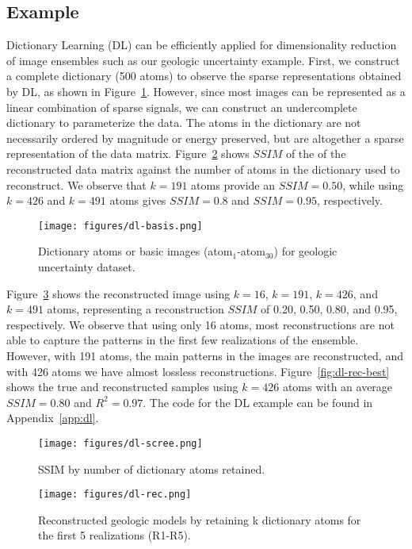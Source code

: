 \documentclass[a4paper,fleqn,12pt]{article}
\begin{document}
\subsection*{Example}
Dictionary Learning (DL) can be efficiently applied for dimensionality reduction of image ensembles such as our geologic uncertainty example. First, we construct a complete dictionary (500 atoms) to observe the sparse representations obtained by DL, as shown in Figure~\ref{fig:dl-basis}. However, since most images can be represented as a linear combination of sparse signals, we can construct an undercomplete dictionary to parameterize the data. The atoms in the dictionary are not necessarily ordered by magnitude or energy preserved, but are altogether a sparse representation of the data matrix. Figure~\ref{fig:dl-scree} shows $SSIM$ of the of the reconstructed data matrix against the number of atoms in the dictionary used to reconstruct. We observe that $k=191$ atoms provide an $SSIM=0.50$, while using $k=426$ and $k=491$ atoms gives $SSIM=0.8$ and $SSIM=0.95$, respectively.

\begin{figure}[H]
    \centering
    \texttt{[image: figures/dl-basis.png]}
    \caption{Dictionary atoms or basic images (atom$_1$-atom$_{30}$) for geologic uncertainty dataset.}
    \label{fig:dl-basis}
\end{figure}

Figure~\ref{fig:dl-rec} shows the reconstructed image using $k=16$, $k=191$, $k=426$, and $k=491$ atoms, representing a reconstruction $SSIM$ of 0.20, 0.50, 0.80, and 0.95, respectively. We observe that using only 16 atoms, most reconstructions are not able to capture the patterns in the first few realizations of the ensemble. However, with 191 atoms, the main patterns in the images are reconstructed, and with 426 atoms we have almost lossless reconstructions. Figure~\ref{fig:dl-rec-best} shows the true and reconstructed samples using $k=426$ atoms with an average $SSIM=0.80$ and $R^2=0.97$. The code for the DL example can be found in Appendix~\ref{app:dl}.

\begin{figure}[H]
    \centering
    \texttt{[image: figures/dl-scree.png]}
    \caption{SSIM by number of dictionary atoms retained.}
    \label{fig:dl-scree}
\end{figure}

\begin{figure}[H]
    \centering
    \texttt{[image: figures/dl-rec.png]}
    \caption{Reconstructed geologic models by retaining k dictionary atoms for the first 5 realizations (R1-R5).}
    \label{fig:dl-rec}
\end{figure}
\end{document}
